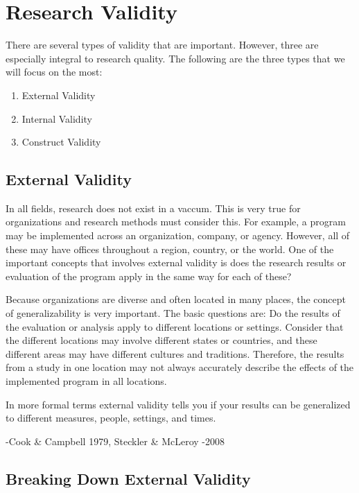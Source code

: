 \documentclass[]{book}
\providecommand{\tightlist}{%
  \setlength{\itemsep}{0pt}\setlength{\parskip}{0pt}}
\theoremstyle{definition}
\theoremstyle{definition}
\theoremstyle{definition}
\theoremstyle{remark}
\begin{document}
\hypertarget{research-validity}{%
\section{Research Validity}\label{research-validity}}

There are several types of validity that are important. However, three
are especially integral to research quality. The following are the three
types that we will focus on the most:

\begin{enumerate}
\def\labelenumi{\arabic{enumi}.}
\tightlist
\item
  External Validity
\item
  Internal Validity
\item
  Construct Validity
\end{enumerate}

\hypertarget{external-validity}{%
\subsection{External Validity}\label{external-validity}}

In all fields, research does not exist in a vaccum. This is very true
for organizations and research methods must consider this. For example,
a program may be implemented across an organization, company, or agency.
However, all of these may have offices throughout a region, country, or
the world. One of the important concepts that involves external validity
is does the research results or evaluation of the program apply in the
same way for each of these?

Because organizations are diverse and often located in many places, the
concept of generalizability is very important. The basic questions are:
Do the results of the evaluation or analysis apply to different
locations or settings. Consider that the different locations may involve
different states or countries, and these different areas may have
different cultures and traditions. Therefore, the results from a study
in one location may not always accurately describe the effects of the
implemented program in all locations.

In more formal terms external validity tells you if your results can be
generalized to different measures, people, settings, and times.

-Cook \& Campbell 1979, Steckler \& McLeroy -2008

\hypertarget{breaking-down-external-validity}{%
\subsection{Breaking Down External
Validity}\label{breaking-down-external-validity}}
\end{document}
